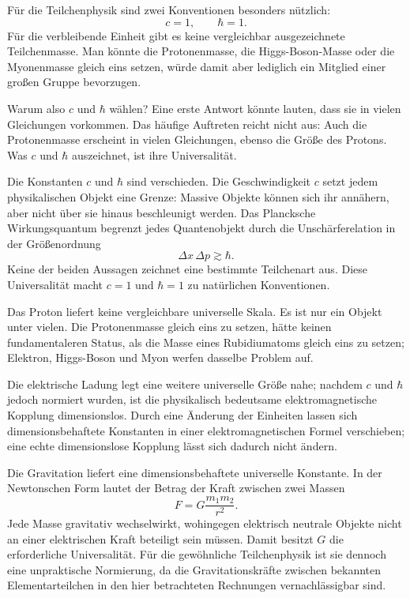 Für die Teilchenphysik sind zwei Konventionen besonders nützlich:
\begin{equation}
c=1,
\qquad
\hbar=1.
\end{equation}
Für die verbleibende Einheit gibt es keine vergleichbar ausgezeichnete Teilchenmasse. Man könnte die Protonenmasse, die Higgs-Boson-Masse oder die Myonenmasse gleich eins setzen, würde damit aber lediglich ein Mitglied einer großen Gruppe bevorzugen.

Warum also \(c\) und \(\hbar\) wählen? Eine erste Antwort könnte lauten, dass sie in vielen Gleichungen vorkommen. Das häufige Auftreten reicht nicht aus: Auch die Protonenmasse erscheint in vielen Gleichungen, ebenso die Größe des Protons. Was \(c\) und \(\hbar\) auszeichnet, ist ihre Universalität.

Die Konstanten \(c\) und \(\hbar\) sind verschieden. Die Geschwindigkeit \(c\) setzt jedem physikalischen Objekt eine Grenze: Massive Objekte können sich ihr annähern, aber nicht über sie hinaus beschleunigt werden. Das Plancksche Wirkungsquantum begrenzt jedes Quantenobjekt durch die Unschärferelation in der Größenordnung
\begin{equation}
\Delta x\,\Delta p\gtrsim\hbar.
\end{equation}
Keine der beiden Aussagen zeichnet eine bestimmte Teilchenart aus. Diese Universalität macht \(c=1\) und \(\hbar=1\) zu natürlichen Konventionen.

Das Proton liefert keine vergleichbare universelle Skala. Es ist nur ein Objekt unter vielen. Die Protonenmasse gleich eins zu setzen, hätte keinen fundamentaleren Status, als die Masse eines Rubidiumatoms gleich eins zu setzen; Elektron, Higgs-Boson und Myon werfen dasselbe Problem auf.

Die elektrische Ladung legt eine weitere universelle Größe nahe; nachdem \(c\) und \(\hbar\) jedoch normiert wurden, ist die physikalisch bedeutsame elektromagnetische Kopplung dimensionslos. Durch eine Änderung der Einheiten lassen sich dimensionsbehaftete Konstanten in einer elektromagnetischen Formel verschieben; eine echte dimensionslose Kopplung lässt sich dadurch nicht ändern.

Die Gravitation liefert eine dimensionsbehaftete universelle Konstante. In der Newtonschen Form lautet der Betrag der Kraft zwischen zwei Massen
\begin{equation}
F=G\frac{m_1m_2}{r^2}.
\end{equation}
Jede Masse gravitativ wechselwirkt, wohingegen elektrisch neutrale Objekte nicht an einer elektrischen Kraft beteiligt sein müssen. Damit besitzt \(G\) die erforderliche Universalität. Für die gewöhnliche Teilchenphysik ist sie dennoch eine unpraktische Normierung, da die Gravitationskräfte zwischen bekannten Elementarteilchen in den hier betrachteten Rechnungen vernachlässigbar sind.

